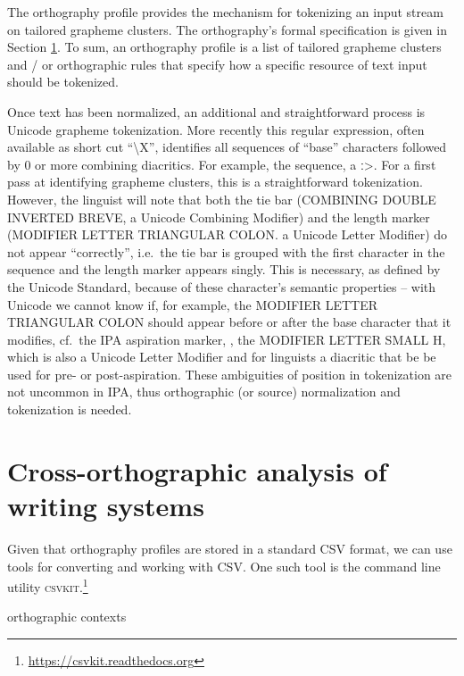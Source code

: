 The orthography profile provides the mechanism for tokenizing an input stream on
tailored grapheme clusters. The orthography's formal specification is given in
Section \ref{}. To sum, an orthography profile is a list of tailored grapheme
clusters and / or orthographic rules that specify how a specific resource of
text input should be tokenized.

Once text has been normalized, an additional and straightforward process is
Unicode grapheme tokenization. More recently this regular expression, often
available as short cut ``\textbackslash{X}'', identifies all sequences of
``base'' characters followed by 0 or more combining diacritics. For example, the
sequence, %
a ː>. For a first pass at identifying grapheme clusters, this is a
straightforward tokenization. However, the linguist will note that both the tie
bar (COMBINING DOUBLE INVERTED BREVE, a Unicode Combining Modifier) and the
length marker (MODIFIER LETTER TRIANGULAR COLON. a Unicode Letter Modifier) do
not appear ``correctly'', i.e.~the tie bar is grouped with the first character
in the sequence and the length marker appears singly. This is necessary, as
defined by the Unicode Standard, because of these character's semantic
properties -- with Unicode we cannot know if, for example, the MODIFIER LETTER
TRIANGULAR COLON should appear before or after the base character that it
modifies, cf.~the IPA aspiration marker, , the MODIFIER LETTER SMALL H, which is
also a Unicode Letter Modifier and for linguists a diacritic that be be used for
pre- or post-aspiration. These ambiguities of position in tokenization are not
uncommon in IPA, thus orthographic (or source) normalization and tokenization is
needed.

\section{Cross-orthographic analysis of writing systems}

Given that orthography profiles are stored in a standard CSV format, we can use
tools for converting and working with CSV. One such tool is the command line
utility \textsc{csvkit}.\footnote{\url{https://csvkit.readthedocs.org}}

orthographic contexts %

